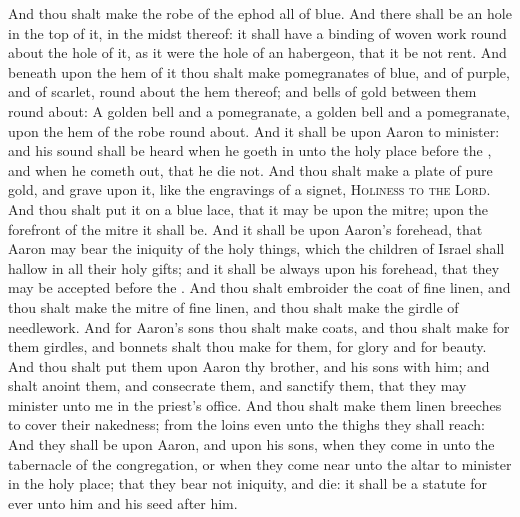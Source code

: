 \begin{biblechapter}
 And thou shalt make the robe of the ephod all of blue.
\verse And there shall be an hole in the top of it, in the midst thereof: it shall have a binding of woven work round about the hole of it, as it were the hole of an habergeon, that it be not rent.
\verse And beneath upon the hem of it thou shalt make pomegranates of blue, and of purple, and of scarlet, round about the hem thereof; and bells of gold between them round about:
\verse A golden bell and a pomegranate, a golden bell and a pomegranate, upon the hem of the robe round about.
\verse And it shall be upon Aaron to minister: and his sound shall be heard when he goeth in unto the holy place before the \LORD, and when he cometh out, that he die not.
\verse And thou shalt make a plate of pure gold, and grave upon it, like the engravings of a signet, \textsc{Holiness to the Lord}.
\verse And thou shalt put it on a blue lace, that it may be upon the mitre; upon the forefront of the mitre it shall be.
\verse And it shall be upon Aaron's forehead, that Aaron may bear the iniquity of the holy things, which the children of Israel shall hallow in all their holy gifts; and it shall be always upon his forehead, that they may be accepted before the \LORD.
\verse And thou shalt embroider the coat of fine linen, and thou shalt make the mitre of fine linen, and thou shalt make the girdle of needlework.
\verse And for Aaron's sons thou shalt make coats, and thou shalt make for them girdles, and bonnets shalt thou make for them, for glory and for beauty.
\verse And thou shalt put them upon Aaron thy brother, and his sons with him; and shalt anoint them, and consecrate them, and sanctify them, that they may minister unto me in the priest's office.
\verse And thou shalt make them linen breeches to cover their nakedness; from the loins even unto the thighs they shall reach:
\verse And they shall be upon Aaron, and upon his sons, when they come in unto the tabernacle of the congregation, or when they come near unto the altar to minister in the holy place; that they bear not iniquity, and die: it shall be a statute for ever unto him and his seed after him.
\end{biblechapter}

